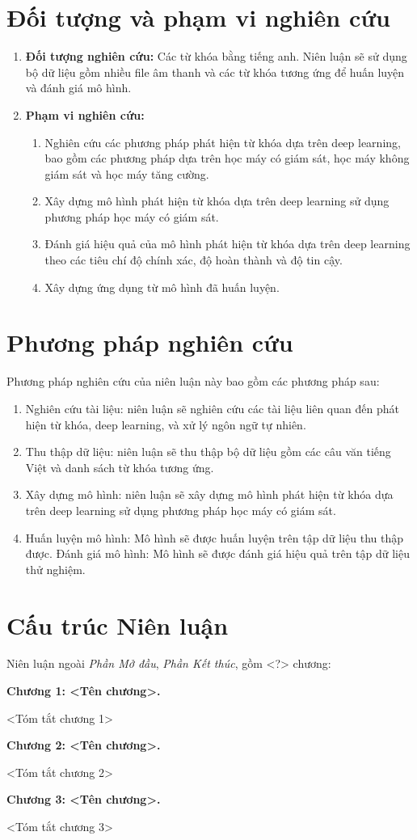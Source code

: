 \section{Đối tượng và phạm vi nghiên cứu}
\begin{enumerate}[label=\textbf{\thesection.\arabic*},align=left,left=0cm..1cm]
	\item \textbf{Đối tượng nghiên cứu:} Các từ khóa bằng tiếng anh. Niên luận sẽ sử dụng bộ dữ liệu gồm nhiều file âm thanh và các từ khóa tương ứng để huấn luyện và đánh giá mô hình.\par
	\item \textbf{Phạm vi nghiên cứu:}
	\begin{enumerate}[label=$-$,align=left,left=0cm..0cm,itemindent=*]
            \item Nghiên cứu các phương pháp phát hiện từ khóa dựa trên deep learning, bao gồm các phương pháp dựa trên học máy có giám sát, học máy không giám sát và học máy tăng cường.
            \item Xây dựng mô hình phát hiện từ khóa dựa trên deep learning sử dụng phương pháp học máy có giám sát.
            \item Đánh giá hiệu quả của mô hình phát hiện từ khóa dựa trên deep learning theo các tiêu chí độ chính xác, độ hoàn thành và độ tin cậy.
            \item Xây dựng ứng dụng từ mô hình đã huấn luyện.
	\end{enumerate}
\end{enumerate}\par

\section{Phương pháp nghiên cứu}
Phương pháp nghiên cứu của niên luận này bao gồm các phương pháp sau:

\begin{enumerate}[label=$-$,align=left,left=1cm..0cm,itemindent=*]
        \item Nghiên cứu tài liệu: niên luận sẽ nghiên cứu các tài liệu liên quan đến phát hiện từ khóa, deep learning, và xử lý ngôn ngữ tự nhiên.
        \item Thu thập dữ liệu: niên luận sẽ thu thập bộ dữ liệu gồm các câu văn tiếng Việt và danh sách từ khóa tương ứng.
        \item Xây dựng mô hình: niên luận sẽ xây dựng mô hình phát hiện từ khóa dựa trên deep learning sử dụng phương pháp học máy có giám sát.
        \item Huấn luyện mô hình: Mô hình sẽ được huấn luyện trên tập dữ liệu thu thập được.
Đánh giá mô hình: Mô hình sẽ được đánh giá hiệu quả trên tập dữ liệu thử nghiệm.
\end{enumerate}

\section{Cấu trúc Niên luận}
Niên luận ngoài \textit{Phần Mở đầu}, \textit{Phần Kết thúc}, gồm <?> chương:\par
\textbf{Chương 1: <Tên chương>.}\par
<Tóm tắt chương 1>\par
\textbf{Chương 2: <Tên chương>.}\par
<Tóm tắt chương 2>\par
\textbf{Chương 3: <Tên chương>.}\par
<Tóm tắt chương 3>\par
